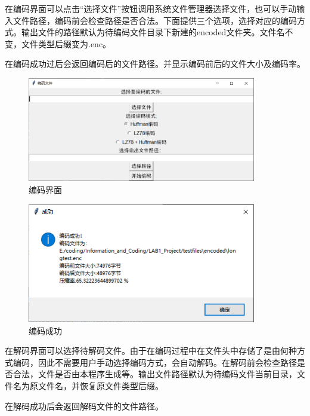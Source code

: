 \documentclass[12pt, a4paper]{ctexart}
\begin{document}
    在编码界面可以点击“选择文件”按钮调用系统文件管理器选择文件，也可以手动输入文件路径，编码前会检查路径是否合法。下面提供三个选项，选择对应的编码方式。输出文件的路径默认为待编码文件目录下新建的encoded文件夹。文件名不变，文件类型后缀变为.enc。

    在编码成功过后会返回编码后的文件路径。并显示编码前后的文件大小及编码率。
    
    \begin{figure}[H]
    \centering
    \includegraphics[width=10cm]{./pic/4-2.png}		
    \caption{编码界面}
    \end{figure}
    \begin{figure}[H]
    \centering
    \includegraphics[width=10cm]{./pic/4-3.png}		
    \caption{编码成功}
    \end{figure}

    在解码界面可以选择待解码文件。由于在编码过程中在文件头中存储了是由何种方式编码，因此不需要用户手动选择编码方式，会自动解码。在解码前会检查路径是否合法，文件是否由本程序生成等。输出文件路径默认为待编码文件当前目录，文件名为原文件名，并恢复原文件类型后缀。

    在解码成功后会返回解码文件的文件路径。
    
\end{document}
